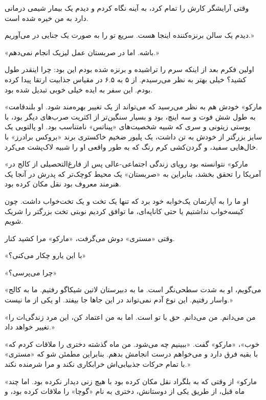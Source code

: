وقتی آرایشگر کارش را تمام کرد، به آینه نگاه کردم و دیدم یک بیمار شیمی درمانی دارد به من خیره شده است.

دیدم یک سالن برنزه‌کننده اینجا هست. سریع تو را به صورت یک جنایی در می‌آوریم.»

«باشه. اما در صربستان عمل لیزیک انجام نمی‌دهم.»

اولین فکرم بعد از اینکه سرم را تراشیده و برنزه شده بودم این بود: چرا اینقدر طول کشید؟ خیلی بهتر به نظر می‌رسیدم. از ۵ به ۶.۵ در مقیاس جذابیت ارتقا پیدا کرده بودم. این سفر به ایده خیلی خوبی تبدیل شده بود.

«مارکو» خودش هم به نظر می‌رسید که می‌تواند از یک تغییر بهره‌مند شود. او بلندقامت به طول شش فوت و سه اینچ، بود و بسیار سنگین‌تر از اکثریت صرب‌های دیگر بود، با پوستی زیتونی و سری که شبیه شخصیت‌های «پیناتس» نامتناسب بود. او پالتویی یک سایز بزرگتر از خودش به تن داشت، یک پلیور ضخیم خاکستری برند «بروکس برادرز» با خال‌هایی سفید، و گردن‌کشی کرم رنگ که به طور واقعی او را شبیه لاک‌پشت می‌کرد.

«مارکو» نتوانسته بود رویای زندگی اجتماعی-عالی پس از فارغ‌التحصیلی از کالج در آمریکا را تحقق بخشد، بنابراین به «صربستان» یک محیط کوچک‌تر که پدرش در آنجا یک هنرمند معروف بود نقل مکان کرده بود.

او ما را به آپارتمان یک‌خوابه خود برد که تنها یک تخت و یک تخت‌خواب داشت. چون کیسه‌خواب نداشتیم یا حتی کاناپه‌ای، ما توافق کردیم نوبتی تخت بزرگتر را شریک شویم.

وقتی «مستری» دوش می‌گرفت، «مارکو» مرا کشید کنار.

«با این یارو چکار می‌کنی؟»

«چرا می‌پرسی؟»

«می‌گویم، او به شدت سطحی‌نگر است. ما به دبیرستان لاتین شیکاگو رفتیم. ما به کالج واسار رفتیم. این نوع آدم نمی‌تواند در این جاها جا بیفتد. او یکی از ما نیست.»

«من می‌دانم. من می‌دانم. حق با تو است. اما به من اعتماد کن، این مرد زندگی‌ات را تغییر خواهد داد.»

«خوب»، «مارکو» گفت. «ببینیم چه می‌شود. من ماه گذشته دختری را ملاقات کردم که با بقیه فرق دارد و می‌خواهم درست انجامش بدهم. بنابراین مطمئن شو که «مستری» با تمام حرکات جذبیابی‌اش خرابکاری نکند و مرا شرمنده نکند.»

«مارکو» از وقتی که به بلگراد نقل مکان کرده بود با هیچ زنی دیدار نکرده بود. اما چند ماه قبل، از طریق یکی از دوستانش، دختری به نام «گوچا» را ملاقات کرده بود، و